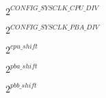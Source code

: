 \documentclass{article}
\begin{document}
$2^{CONFIG\_SYSCLK\_CPU\_DIV}$
\pagebreak

$2^{CONFIG\_SYSCLK\_PBA\_DIV}$
\pagebreak

$2^{cpu\_shift}$
\pagebreak

$2^{pba\_shift}$
\pagebreak

$2^{pbb\_shift}$
\pagebreak
\end{document}
